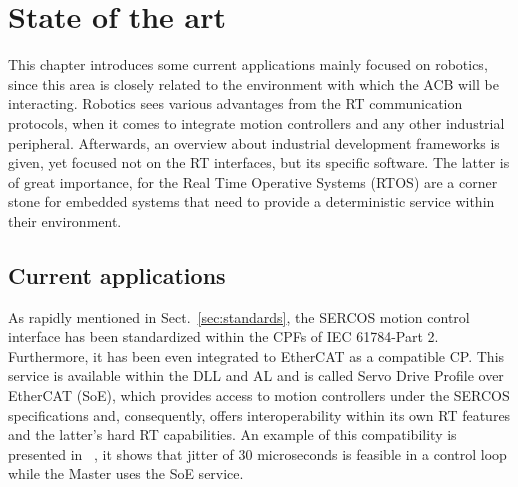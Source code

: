 \chapter{State of the art}\label{cha:state}

%
%  
%

This chapter introduces some current applications mainly focused on robotics, since this area is closely
related to the environment with which the ACB will be interacting. Robotics sees various advantages
from the RT communication protocols, when it comes to integrate motion controllers and 
any other industrial peripheral. Afterwards, an overview about industrial development frameworks is 
given, yet focused not on the RT interfaces, but its specific software. The latter is of great importance,
for the Real Time Operative Systems (RTOS) are a corner stone for embedded systems that need to provide a 
deterministic service within their environment.


\section{Current applications}\label{sec:applications}

As rapidly mentioned in Sect.~\ref{sec:standards}, the SERCOS motion control interface has been standardized within the 
CPFs of IEC 61784-Part 2. Furthermore, it has been even integrated to EtherCAT as a compatible CP. 
This service is available within the DLL and AL and is called Servo Drive Profile over EtherCAT  (SoE), 
which provides access to motion controllers under 
the SERCOS specifications and, consequently, offers interoperability within its own RT features and the latter's hard RT 
capabilities.  
An example of this compatibility is presented in ~\cite{ecat_sercos}, %
it shows that jitter of 30 microseconds is feasible in a control loop while the Master uses the SoE service.

